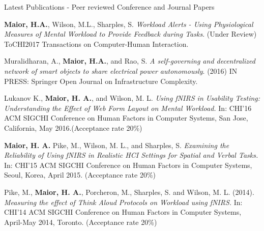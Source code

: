\documentclass{resume} %
\begin{document}
\begin{rSection}{Latest Publications - Peer reviewed Conference and Journal Papers}
\vspace{-3 mm}
\item \textbf{Maior, H.A.}, Wilson, M.L., Sharples, S. \emph{Workload Alerts - Using Physiological Measures of Mental Workload to Provide Feedback during Tasks}. (Under Review) ToCHI2017 Transactions on Computer-Human Interaction.

\item Muralidharan, A., \textbf{Maior, H.A.}, and Rao, S. \emph{A self-governing and decentralized network of smart objects to share electrical power autonomously}. (2016) IN PRESS: Springer Open Journal on Infrastructure Complexity.
 	
\item Lukanov K., \textbf{Maior, H. A.}, and Wilson, M. L. \emph{Using fNIRS in Usability Testing: Understanding the Effect of Web Form Layout on Mental Workload.} In: CHI'16 ACM SIGCHI Conference on Human Factors in Computer Systems, San Jose, California, May 2016.(Acceptance rate 20\%)

\item \textbf{Maior, H. A.} Pike, M., Wilson, M. L., and Sharples, S. \emph{Examining the Reliability of Using fNIRS in Realistic HCI Settings for Spatial and Verbal Tasks.} In: CHI'15 ACM SIGCHI Conference on Human Factors in Computer Systems, Seoul, Korea, April 2015. (Acceptance rate 20\%)


\item Pike, M., \textbf{Maior, H. A.}, Porcheron, M., Sharples, S. and Wilson, M. L. (2014). \emph{Measuring the effect of Think Aloud Protocols on Workload using fNIRS.} In: CHI'14 ACM SIGCHI Conference on Human Factors in Computer Systems, April-May 2014, Toronto. (Acceptance rate 20\%)


\end{rSection}
\end{document}
